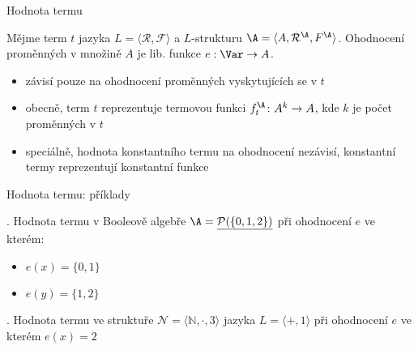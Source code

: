 \documentclass{beamer}
\begin{document}
\begin{frame}{Hodnota termu}

    Mějme term $t$ jazyka $L=\langle \mathcal R,\mathcal F\rangle$ a $L$-strukturu $\A=\langle A,\mathcal R^\A,F^\A\rangle$. \pause\alert{Ohodnocení proměnných} v množině $A$ je lib. funkce $e:\Var\to A$.\pause
    

    \pause
    \begin{itemize}
        \item závisí pouze na ohodnocení proměnných vyskytujících se v $t$\pause
        \item obecně, term $t$ reprezentuje \alert{termovou funkci} $f_t^\A\colon A^k\to A$, kde $k$ je počet proměnných v $t$\pause
        \item speciálně, hodnota konstantního termu na ohodnocení nezávisí, konstantní termy reprezentují konstantní funkce
    \end{itemize}
    
\end{frame}


\begin{frame}{Hodnota termu: příklady}
    
    . Hodnota termu  v Booleově algebře $\A=\underline{\mathcal P(\{0,1,2\})}$ při ohodnocení $e$ ve kterém:
        \begin{itemize}
            \item $e(x)=\{0,1\}$
            \item $e(y)=\{1,2\}$
        \end{itemize}
  
        \pause
    
    \bigskip\bigskip

    . Hodnota termu  ve struktuře $\mathcal N=\langle\mathbb N,\cdot,3\rangle$ jazyka $L=\langle +,1\rangle$ při ohodnocení $e$ ve kterém $e(x)=2$ 

         \pause
    
\end{frame}
\end{document}
